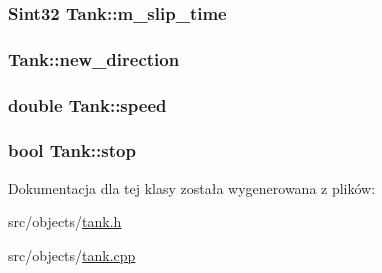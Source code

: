 \subsubsection[{m\+\_\+slip\+\_\+time}]{\setlength{\rightskip}{0pt plus 5cm}Sint32 Tank\+::m\+\_\+slip\+\_\+time\hspace{0.3cm}{\ttfamily [protected]}}\label{class_tank_aee43131c389c141d21ac58f3a6dbb025}
\hypertarget{class_tank_a4411d9cf4dd459296b320e36d08e7f12}{}
\subsubsection[{new\+\_\+direction}]{ Tank\+::new\+\_\+direction\hspace{0.3cm}{\ttfamily [protected]}}\label{class_tank_a4411d9cf4dd459296b320e36d08e7f12}
\hypertarget{class_tank_a4c19847eec64e4d3793885150145aa93}{}
\subsubsection[{speed}]{\setlength{\rightskip}{0pt plus 5cm}double Tank\+::speed}\label{class_tank_a4c19847eec64e4d3793885150145aa93}
\hypertarget{class_tank_a4134e3bc03ed6453f1e76f161f29a657}{}
\subsubsection[{stop}]{\setlength{\rightskip}{0pt plus 5cm}bool Tank\+::stop}\label{class_tank_a4134e3bc03ed6453f1e76f161f29a657}


Dokumentacja dla tej klasy została wygenerowana z plików\+:\begin{DoxyCompactItemize}
\item 
src/objects/\hyperlink{tank_8h}{tank.\+h}\item 
src/objects/\hyperlink{tank_8cpp}{tank.\+cpp}\end{DoxyCompactItemize}
